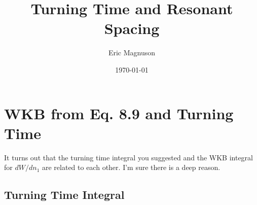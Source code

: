 \documentclass[aps,pra,preprint,groupedaddress]{revtex4-1}
\begin{document}
\title{Turning Time and Resonant Spacing}

\author{Eric Magnuson}
\date{\today}

\maketitle

\section{\label{sec:WKBtt} WKB from Eq. 8.9 and Turning Time}

It turns out that the turning time integral you suggested and the WKB integral for $dW/dn_1$ are related to each other. I'm sure there is a deep reason.

\subsection{\label{sec:tt} Turning Time Integral}
\end{document}
